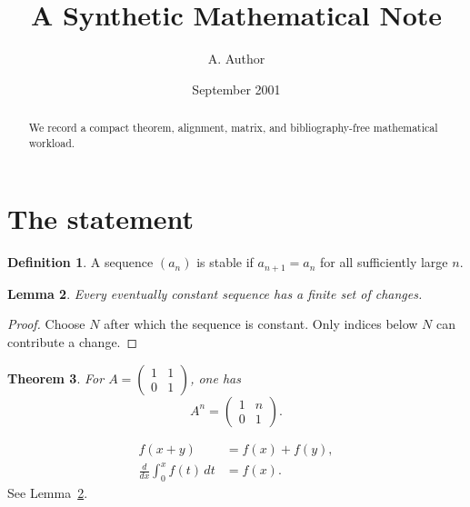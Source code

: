 \documentclass[11pt]{amsart}
\title{A Synthetic Mathematical Note}
\author{A. Author}
\date{September 2001}
\newtheorem{theorem}{Theorem}
\newtheorem{lemma}[theorem]{Lemma}
\theoremstyle{definition}
\newtheorem{definition}[theorem]{Definition}
\begin{document}
\begin{abstract}
We record a compact theorem, alignment, matrix, and bibliography-free
mathematical workload.
\end{abstract}
\maketitle

\section{The statement}
\begin{definition}
A sequence $(a_n)$ is stable if $a_{n+1}=a_n$ for all sufficiently large $n$.
\end{definition}

\begin{lemma}\label{lem:finite}
Every eventually constant sequence has a finite set of changes.
\end{lemma}

\begin{proof}
Choose $N$ after which the sequence is constant. Only indices below $N$ can
contribute a change.
\end{proof}

\begin{theorem}
For $A=\begin{pmatrix}1&1\\0&1\end{pmatrix}$, one has
\[
  A^n=\begin{pmatrix}1&n\\0&1\end{pmatrix}.
\]
\end{theorem}

\begin{align}
 f(x+y) &= f(x)+f(y), \\
 \frac{d}{dx}\int_0^x f(t)\,dt &= f(x).
\end{align}
See Lemma~\ref{lem:finite}.
\end{document}
